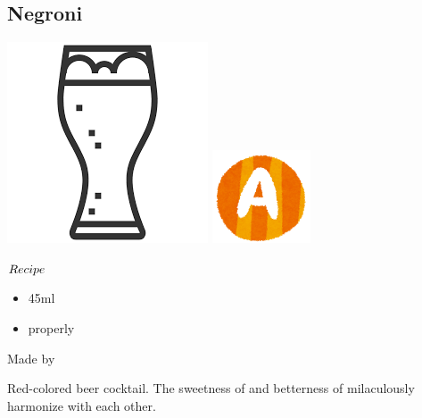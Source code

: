 \subsection{Negroni}
\vspace{-7.5mm}
\hspace{27mm}
\includegraphics[scale=.06]{tumbler.png}
\includegraphics[scale=.12]{capital_a.png}
\vspace{2.5mm}
\begin{itembox}[l]{\boldmath $Recipe$}
\begin{itemize}
\setlength{\parskip}{0cm}
\setlength{\itemsep}{0cm}
\item \campari 45ml
\item \beer properly
\end{itemize}
\vspace{-4mm}
Made by \build
\end{itembox}
Red-colored beer cocktail. The sweetness of \campari and betterness of \beer milaculously harmonize with each other.
